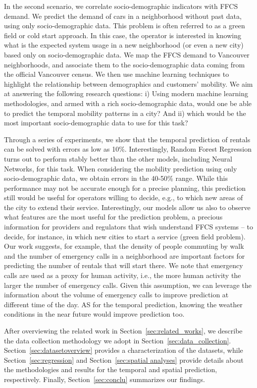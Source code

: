 In the second scenario, we correlate socio-demographic indicators with FFCS demand. 
We predict the demand of cars in a neighborhood without past data, using only socio-demographic data. 
This problem is often referred to as a green field or cold start approach. In this case, the operator is interested in knowing what is the expected system usage in a new neighborhood (or even a new city) based only on socio-demographic data. 
We map the FFCS demand to Vancouver neighborhoods, and associate them to the socio-demographic data coming from the official Vancouver census. We then use machine learning techniques to highlight the relationship between demographics and customers' mobility.  
We aim at answering the following research questions: i) Using modern machine learning methodologies, and armed with a rich socio-demographic data, would one be able to predict the temporal mobility patterns in a city?  
And ii) which would be the most important socio-demographic data to use for this task?


Through a series of experiments, we show that the temporal prediction of rentals can be solved with errors as low as 10\%. Interestingly, Random Forest Regression turns out to perform stably better than the other models, including Neural Networks, for this task.
When considering the mobility prediction using only socio-demographic data, we obtain errors in the 40-50\% range. While this performance may not be accurate enough for a precise planning, this prediction still would be useful for operators willing to decide, e.g., to which new areas of the city to extend their service.  Interestingly, our models allow us also to observe what features are the most useful for the prediction problem, a precious information for providers and regulators that wish understand FFCS systems -- to decide, for instance, in which new cities to start a service (green field problem). 
Our work suggests, for example, that the density of people commuting by walk and the number of emergency calls in a neighborhood are important factors for predicting the number of rentals that will start there. 
We note that emergency calls are used as a proxy for human activity, i.e., the more human activity the larger the number of emergency calls. Given this assumption, we can leverage the information about the volume of emergency calls to improve prediction at different time of the day.
AS for the temporal prediction, knowing the weather conditions in the near future would improve prediction too. 

After overviewing the related work in Section~\ref{sec:related_works}, we describe the data collection methodology we adopt in Section~\ref{sec:data_collection}. Section~\ref{sec:datasetoverview} provides a characterization of the datasets, while Section~\ref{sec:regression} and Section~\ref{sec:spatial analyses} provide details about the methodologies and results for the temporal and spatial prediction, respectively. Finally, Section~\ref{sec:conclu} summarizes our findings.